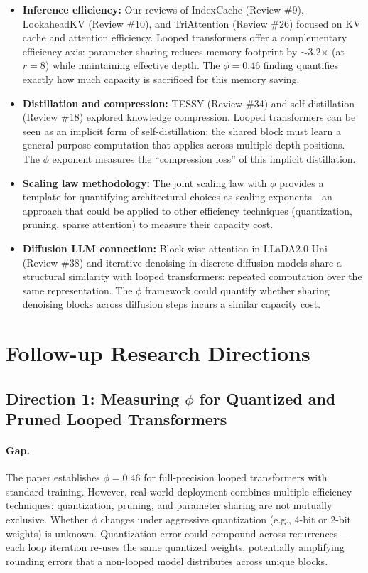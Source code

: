 \documentclass[11pt]{article}
\begin{document}
\begin{itemize}
    \item \textbf{Inference efficiency:} Our reviews of IndexCache (Review \#9), LookaheadKV (Review \#10), and TriAttention (Review \#26) focused on KV cache and attention efficiency. Looped transformers offer a complementary efficiency axis: parameter sharing reduces memory footprint by $\sim$3.2$\times$ (at $r{=}8$) while maintaining effective depth. The $\phi = 0.46$ finding quantifies exactly how much capacity is sacrificed for this memory saving.
    \item \textbf{Distillation and compression:} TESSY (Review \#34) and self-distillation (Review \#18) explored knowledge compression. Looped transformers can be seen as an implicit form of self-distillation: the shared block must learn a general-purpose computation that applies across multiple depth positions. The $\phi$ exponent measures the ``compression loss'' of this implicit distillation.
    \item \textbf{Scaling law methodology:} The joint scaling law with $\phi$ provides a template for quantifying architectural choices as scaling exponents---an approach that could be applied to other efficiency techniques (quantization, pruning, sparse attention) to measure their capacity cost.
    \item \textbf{Diffusion LLM connection:} Block-wise attention in LLaDA2.0-Uni (Review \#38) and iterative denoising in discrete diffusion models share a structural similarity with looped transformers: repeated computation over the same representation. The $\phi$ framework could quantify whether sharing denoising blocks across diffusion steps incurs a similar capacity cost.
\end{itemize}

\section{Follow-up Research Directions}

\subsection{Direction 1: Measuring $\phi$ for Quantized and Pruned Looped Transformers}

\paragraph{Gap.}
The paper establishes $\phi = 0.46$ for full-precision looped transformers with standard training. However, real-world deployment combines multiple efficiency techniques: quantization, pruning, and parameter sharing are not mutually exclusive. Whether $\phi$ changes under aggressive quantization (e.g., 4-bit or 2-bit weights) is unknown. Quantization error could compound across recurrences---each loop iteration re-uses the same quantized weights, potentially amplifying rounding errors that a non-looped model distributes across unique blocks.
\end{document}
